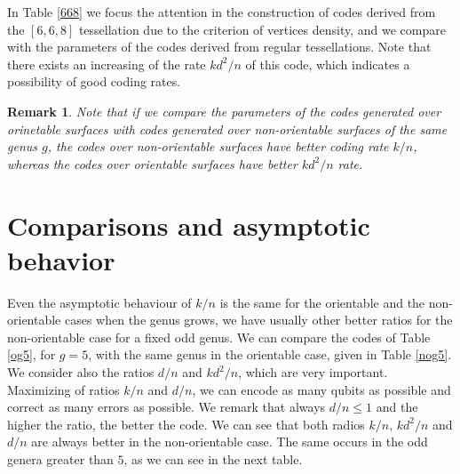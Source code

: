 \documentclass[%
reprint,
amsmath,amssymb,
aps,
]{revtex4-2}
\newtheorem{remark}[theorem]{{\bf Remark}}
\begin{document}
In Table \ref{668} we focus the attention in the construction of codes derived from the $[6,6,8]$ tessellation due to the criterion of vertices density, and we compare with the parameters of the codes derived from regular tessellations. Note that there exists an increasing of the rate $kd^2/n$ of this code, which indicates a possibility of good coding rates.

\begin{remark}
	Note that if we compare the parameters of the codes generated over orinetable surfaces with codes generated over non-orientable surfaces of the same genus $g$, the codes over non-orientable surfaces have better coding rate $k/n$, whereas the codes over orientable surfaces have better $kd^2/n$ rate.
\end{remark}

\section{Comparisons and asymptotic behavior}\label{CAB}

Even the asymptotic behaviour of $k/n$ is the same for the orientable and the non-orientable cases when the genus grows, we have usually other better ratios for the non-orientable case for a fixed odd genus. We can compare the codes of Table \ref{og5}, for $g = 5$, with the same genus in the orientable case, given in Table \ref{nog5}. We consider also the ratios $d/n$ and $k d^2/n$, which are very important. Maximizing of ratios $k/n$ and $d/n$, we can encode as many qubits as possible and correct as many errors as possible. We remark that always $d/n \leq 1$ and the higher the ratio, the better the code. We can see that both radios $k/n$, $k d^2/n$ and $d/n$ are always better in the non-orientable case. The same occurs in the odd genera greater than $5$, as we can see in the next table.
\end{document}
